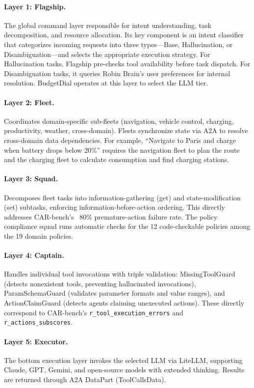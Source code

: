 \documentclass{article}
\begin{document}
\paragraph{Layer 1: Flagship.} The global command layer responsible for intent understanding, task decomposition, and resource allocation. Its key component is an intent classifier that categorizes incoming requests into three types---Base, Hallucination, or Disambiguation---and selects the appropriate execution strategy. For Hallucination tasks, Flagship pre-checks tool availability before task dispatch. For Disambiguation tasks, it queries Robin Brain's user preferences for internal resolution. BudgetDial operates at this layer to select the LLM tier.

\paragraph{Layer 2: Fleet.} Coordinates domain-specific sub-fleets (navigation, vehicle control, charging, productivity, weather, cross-domain). Fleets synchronize state via A2A to resolve cross-domain data dependencies. For example, ``Navigate to Paris and charge when battery drops below 20\%'' requires the navigation fleet to plan the route and the charging fleet to calculate consumption and find charging stations.

\paragraph{Layer 3: Squad.} Decomposes fleet tasks into information-gathering (get) and state-modification (set) subtasks, enforcing information-before-action ordering. This directly addresses CAR-bench's ~80\% premature-action failure rate. The policy compliance squad runs automatic checks for the 12 code-checkable policies among the 19 domain policies.

\paragraph{Layer 4: Captain.} Handles individual tool invocations with triple validation: MissingToolGuard (detects nonexistent tools, preventing hallucinated invocations), ParamSchemaGuard (validates parameter formats and value ranges), and ActionClaimGuard (detects agents claiming unexecuted actions). These directly correspond to CAR-bench's \texttt{r\_tool\_execution\_errors} and \texttt{r\_actions\_subscores}.

\paragraph{Layer 5: Executor.} The bottom execution layer invokes the selected LLM via LiteLLM, supporting Claude, GPT, Gemini, and open-source models with extended thinking. Results are returned through A2A DataPart (ToolCallsData).
\end{document}
